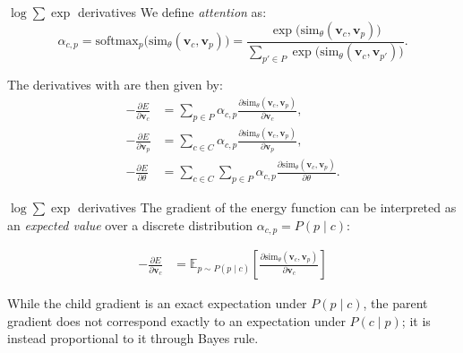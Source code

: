 \documentclass{beamer}
\begin{document}
\begin{frame}{$\log \sum \exp$ derivatives}
    We define \emph{attention} as:
    \[
    \alpha_{c,p} = \text{softmax}_p\bigl(\mathrm{sim}_\theta(\bm{v}_c, \bm{v}_p)\bigr) = \frac{\exp\bigl(\mathrm{sim}_\theta(\bm{v}_c, \bm{v}_p)\bigr)}{\sum_{p' \in P} \exp\bigl(\mathrm{sim}_\theta(\bm{v}_c, \bm{v}_{p'})\bigr)}.
    \]
    
    The derivatives with are then given by:
    \[
    \begin{aligned}
        -\frac{\partial E}{\partial \bm{v}_c} &= \sum_{p \in P} \alpha_{c,p} \frac{\partial \mathrm{sim}_\theta(\bm{v}_c, \bm{v}_p)}{\partial \bm{v}_c}, \\
        -\frac{\partial E}{\partial \bm{v}_p} &= \sum_{c \in C} \alpha_{c,p} \frac{\partial \mathrm{sim}_\theta(\bm{v}_c, \bm{v}_p)}{\partial \bm{v}_p}, \\
        -\frac{\partial E}{\partial \theta} &= \sum_{c \in C} \sum_{p \in P} \alpha_{c,p} \frac{\partial \mathrm{sim}_\theta(\bm{v}_c, \bm{v}_p)}{\partial \theta}.
    \end{aligned}
    \]
\end{frame}

\begin{frame}{$\log \sum \exp$ derivatives}
    The gradient of the energy function can be interpreted as an \emph{expected value} over a discrete distribution $\alpha_{c,p} = P(p \mid c)$:

    \begin{equation}
    \begin{aligned}
        -\frac{\partial E}{\partial \bm{v}_c} &= \mathbb{E}_{p \sim P(p \mid c)} \left[ \frac{\partial \mathrm{sim}_\theta(\bm{v}_c, \bm{v}_p)}{\partial \bm{v}_c} \right]
    \end{aligned}
    \end{equation}

    \bigskip

    While the child gradient is an exact expectation under $P(p \mid c)$, the parent gradient does not correspond exactly to an expectation under $P(c \mid p)$; it is instead proportional to it through Bayes rule. 
\end{frame}
\end{document}
